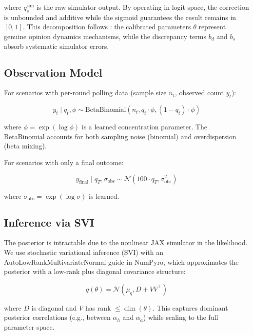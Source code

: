 \documentclass[12pt]{article}
\begin{document}
where $q_s^{\text{sim}}$ is the raw simulator output. By operating in logit space, the correction is unbounded and additive while the sigmoid guarantees the result remains in $[0, 1]$. This decomposition follows \citet{kennedy2001}: the calibrated parameters $\theta$ represent genuine opinion dynamics mechanisms, while the discrepancy terms $b_d$ and $b_s$ absorb systematic simulator errors.

\subsection{Observation Model}

For scenarios with per-round polling data (sample size $n_t$, observed count $y_t$):

\begin{equation}\label{eq:19}
y_t \mid q_t, \phi \sim \text{BetaBinomial}(n_t, q_t \cdot \phi, (1 - q_t) \cdot \phi)
\end{equation}

where $\phi = \exp(\log \phi)$ is a learned concentration parameter. The BetaBinomial accounts for both sampling noise (binomial) and overdispersion (beta mixing).

For scenarios with only a final outcome:

\begin{equation}\label{eq:20}
y_{\text{final}} \mid q_T, \sigma_{\text{obs}} \sim \mathcal{N}(100 \cdot q_T, \sigma_{\text{obs}}^2)
\end{equation}

where $\sigma_{\text{obs}} = \exp(\log \sigma)$ is learned.

\subsection{Inference via SVI}

The posterior is intractable due to the nonlinear JAX simulator in the likelihood. We use stochastic variational inference (SVI) with an AutoLowRankMultivariateNormal guide in NumPyro, which approximates the posterior with a low-rank plus diagonal covariance structure:

\begin{equation}\label{eq:21}
q(\theta) = \mathcal{N}(\mu_q, D + VV^\top)
\end{equation}

where $D$ is diagonal and $V$ has rank $\leq \dim(\theta)$. This captures dominant posterior correlations (e.g., between $\alpha_h$ and $\alpha_a$) while scaling to the full parameter space.
\end{document}
